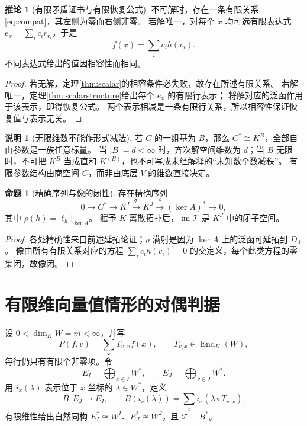 \documentclass[UTF8,11pt,a4paper]{ctexart}
\theoremstyle{definition}
\newtheorem{proposition}[theorem]{命题}
\newtheorem{corollary}[theorem]{推论}
\newtheorem{remark}[theorem]{说明}
\newcommand{\End}{\operatorname{End}}
\newcommand{\im}{\operatorname{im}}
\newcommand{\T}{\mathcal T}
\numberwithin{equation}{section}
\begin{document}
\begin{corollary}[有限矛盾证书与有限恢复公式]
不可解时，存在一条有限关系\eqref{eq:compat}，其左侧为零而右侧非零。
若解唯一，对每个 $x$ 均可选有限表达式 $e_x=\sum_i c_ir_{v_i}$，于是
\[
 f(x)=\sum_i c_i h(v_i).
\]
不同表达式给出的值因相容性而相同。
\end{corollary}
\begin{proof}
若无解，定理\ref{thm:scalar}的相容条件必失败，故存在所述有限关系。
若解唯一，定理\ref{thm:scalarstructure}给出每个 $e_x$ 的有限行表示；
将解对应的泛函作用于该表示，即得恢复公式。
两个表示相减是一条有限行关系，所以相容性保证恢复值与表示无关。
\end{proof}

\begin{remark}[无限维数不能作形式减法]
若 $C$ 的一组基为 $B$，那么 $C^*\cong K^B$，全部自由参数是一族任意标量。
当 $|B|=d<\infty$ 时，齐次解空间维数为 $d$；当 $B$ 无限时，不可把 $K^B$ 当成直和 $K^{(B)}$，也不可写成未经解释的“未知数个数减秩”。
有限参数结构由商空间 $C$，而非由底层 $V$ 的维数直接决定。
\end{remark}

\begin{proposition}[精确序列与像的闭性]
存在精确序列
\[
 0\longrightarrow C^*\longrightarrow K^I
 \xrightarrow{\T}K^J\xrightarrow{\rho}(\ker A)^*
 \longrightarrow0,
\]
其中 $\rho(h)=\ell_h|_{\ker A}$。
赋予 $K$ 离散拓扑后，$\im\T$ 是 $K^J$ 中的闭子空间。
\end{proposition}
\begin{proof}
各处精确性来自前述延拓论证；$\rho$ 满射是因为 $\ker A$ 上的泛函可延拓到 $D_J$。
像由所有有限关系对应的方程 $\sum_i c_ih(v_i)=0$ 的交定义，每个此类方程的零集闭，故像闭。
\end{proof}

\section{有限维向量值情形的对偶判据}\label{sec:vectorfinite}
设 $0<\dim_KW=m<\infty$，并写
\[
 P(f,v)=\sum_x T_{v,x}f(x),\qquad T_{v,x}\in\End_K(W),
\]
每行仍只有有限个非零项。令
\[
 E_I=\bigoplus_{x\in I}W^*,\qquad E_J=\bigoplus_{v\in J}W^*.
\]
用 $i_x(\lambda)$ 表示位于 $x$ 坐标的 $\lambda\in W^*$，定义
\begin{equation}\label{eq:Bdual}
 B:E_J\to E_I,\qquad
 B(i_v(\lambda))=\sum_x i_x(\lambda\circ T_{v,x}).
\end{equation}
有限维性给出自然同构 $E_I^*\cong W^I$、$E_J^*\cong W^J$，且 $\T=B^*$。
\end{document}
